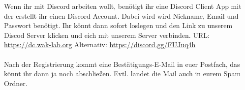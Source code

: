 Wenn ihr mit Discord arbeiten wollt, benötigt ihr eine Discord Client App mit der erstellt ihr einen Discord Account. Dabei wird wird Nickname, Email und Passwort benötigt. Ihr könnt dann sofort loslegen und den Link zu unserem Discod Server klicken und eich mit unserem Server verbinden. URL: \url{https://dc.wak-lab.org} Alternativ: \url{https://discord.gg/FUJuq4h}\\
\ \\
Nach der Registrierung kommt eine Bestätigungs-E-Mail in euer Postfach, das könnt ihr dann ja noch abschließen. Evtl. landet die Mail auch in eurem Spam Ordner. \\
\ \\


